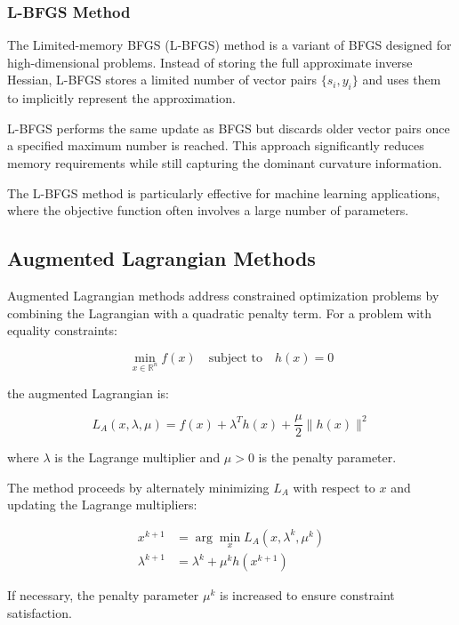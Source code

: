 \subsubsection{L-BFGS Method}

The Limited-memory BFGS (L-BFGS) method is a variant of BFGS designed for high-dimensional problems. Instead of storing the full approximate inverse Hessian, L-BFGS stores a limited number of vector pairs $\{s_i, y_i\}$ and uses them to implicitly represent the approximation.

L-BFGS performs the same update as BFGS but discards older vector pairs once a specified maximum number is reached. This approach significantly reduces memory requirements while still capturing the dominant curvature information.

The L-BFGS method is particularly effective for machine learning applications, where the objective function often involves a large number of parameters.

\subsection{Augmented Lagrangian Methods}

Augmented Lagrangian methods address constrained optimization problems by combining the Lagrangian with a quadratic penalty term. For a problem with equality constraints:

\begin{equation}
\min_{x \in \mathbb{R}^n} f(x) \quad \text{subject to} \quad h(x) = 0
\end{equation}

the augmented Lagrangian is:

\begin{equation}
L_A(x, \lambda, \mu) = f(x) + \lambda^T h(x) + \frac{\mu}{2} \|h(x)\|^2
\end{equation}

where $\lambda$ is the Lagrange multiplier and $\mu > 0$ is the penalty parameter.

The method proceeds by alternately minimizing $L_A$ with respect to $x$ and updating the Lagrange multipliers:

\begin{align}
x^{k+1} &= \arg\min_x L_A(x, \lambda^k, \mu^k) \\
\lambda^{k+1} &= \lambda^k + \mu^k h(x^{k+1})
\end{align}

If necessary, the penalty parameter $\mu^k$ is increased to ensure constraint satisfaction.

